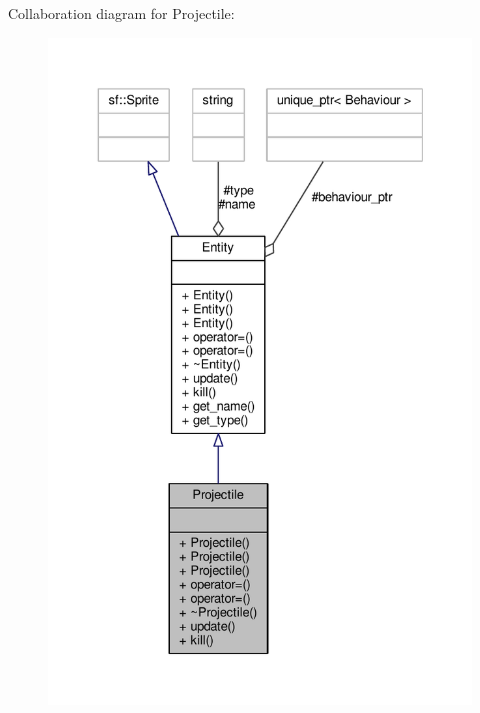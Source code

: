 Collaboration diagram for Projectile\+:\nopagebreak
\begin{figure}[H]
\begin{center}
\leavevmode
\includegraphics[width=336pt]{classProjectile__coll__graph}
\end{center}
\end{figure}

